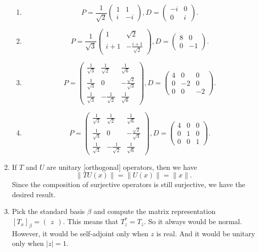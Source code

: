 \begin{enumerate}
\begin{enumerate}
\item \[P=\frac{1}{\sqrt{2}}\begin{pmatrix}1&1\\i&-i\end{pmatrix}, D=\begin{pmatrix}-i&0\\0&i\end{pmatrix}.\]
\item \[P=\frac{1}{\sqrt{3}}\begin{pmatrix}1&\sqrt{2}\\i+1&-\frac{i+1}{\sqrt{2}}\end{pmatrix}, D=\begin{pmatrix}8&0\\0&-1\end{pmatrix}.\]
\item \[P=\begin{pmatrix}\frac{1}{\sqrt{3}}&\frac{1}{\sqrt{2}}&\frac{1}{\sqrt{6}}\\\frac{1}{\sqrt{3}}&0&-\frac{\sqrt{2}}{\sqrt{3}}\\\frac{1}{\sqrt{3}}&-\frac{1}{\sqrt{2}}&\frac{1}{\sqrt{6}} \end{pmatrix}, D=\begin{pmatrix}4&0&0\\0&-2&0\\0&0&-2 \end{pmatrix}.\]
\item \[P=\begin{pmatrix}\frac{1}{\sqrt{3}}&\frac{1}{\sqrt{2}}&\frac{1}{\sqrt{6}}\\\frac{1}{\sqrt{3}}&0&-\frac{\sqrt{2}}{\sqrt{3}}\\\frac{1}{\sqrt{3}}&-\frac{1}{\sqrt{2}}&\frac{1}{\sqrt{6}} \end{pmatrix}, D=\begin{pmatrix}4&0&0\\0&1&0\\0&0&1 \end{pmatrix}.\]
\end{enumerate}
\item If $T$ and $U$ are unitary [orthogonal] operators, then we have 
\[\|TU(x)\|=\|U(x)\|=\|x\|.\]
Since the composition of surjective operators is still surjective, we have the desired result.
\item Pick the standard basis $\beta $ and compute the matrix representation $[T_x]_{\beta}=\begin{pmatrix}z\end{pmatrix}$. This means that $T_z^*=T_{\overline{z}}$. So it always would be normal. However, it would be self-adjoint only when $z$ is real. And it would be unitary only when $|z|=1$.

\end{enumerate}

